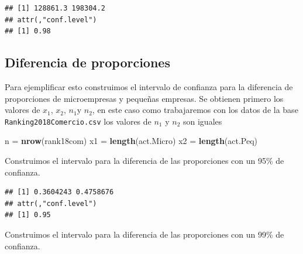 \documentclass[
]{krantz}
\makeatletter
\newenvironment{Shaded}{\begin{snugshade}}{\end{snugshade}}
\newcommand{\DataTypeTok}[1]{\textcolor[rgb]{0.27,0.27,0.27}{#1}}
\newcommand{\FloatTok}[1]{\textcolor[rgb]{0.06,0.06,0.06}{#1}}
\newcommand{\KeywordTok}[1]{\textcolor[rgb]{0.27,0.27,0.27}{\textbf{#1}}}
\newcommand{\NormalTok}[1]{#1}
\newcommand{\OperatorTok}[1]{\textcolor[rgb]{0.43,0.43,0.43}{\textbf{#1}}}
\newcommand{\StringTok}[1]{\textcolor[rgb]{0.5,0.5,0.5}{#1}}
\newenvironment{kframe}{%
\medskip{}
\setlength{\fboxsep}{.8em}
 \def\at@end@of@kframe{}%
 \ifinner\ifhmode%
  \def\at@end@of@kframe{\end{minipage}}%
  \begin{minipage}{\columnwidth}%
 \fi\fi%
 \def\FrameCommand##1{\hskip\@totalleftmargin \hskip-\fboxsep
 \colorbox{shadecolor}{##1}\hskip-\fboxsep
     \hskip-\linewidth \hskip-\@totalleftmargin \hskip\columnwidth}%
 \MakeFramed {\advance\hsize-\width
   \@totalleftmargin\z@ \linewidth\hsize
   \@setminipage}}%
 {\par\unskip\endMakeFramed%
 \at@end@of@kframe}
\renewenvironment{Shaded}{\begin{kframe}}{\end{kframe}}
\makeatother
\begin{document}
\begin{verbatim}
## [1] 128861.3 198304.2
## attr(,"conf.level")
## [1] 0.98
\end{verbatim}

\hypertarget{diferencia-de-proporciones}{%
\subsection{Diferencia de proporciones}\label{diferencia-de-proporciones}}

Para ejemplificar esto construimos el intervalo de confianza para la diferencia de proporciones de microempresas y pequeñas empresas. Se obtienen primero los valores de \(x_1\), \(x_2\), \(n_1\)y \(n_2\), en este caso como trabajaremos con los datos de la base \texttt{Ranking2018Comercio.csv} los valores de \(n_1\) y \(n_2\) son iguales

\begin{Shaded}
\begin{Highlighting}[]
\NormalTok{n =}\StringTok{ }\KeywordTok{nrow}\NormalTok{(rank18com)}
\NormalTok{x1 =}\StringTok{ }\KeywordTok{length}\NormalTok{(act.Micro)}
\NormalTok{x2 =}\StringTok{ }\KeywordTok{length}\NormalTok{(act.Peq)}
\end{Highlighting}
\end{Shaded}

Construimos el intervalo para la diferencia de las proporciones con un 95\% de confianza.

\begin{Shaded}
\end{Shaded}

\begin{verbatim}
## [1] 0.3604243 0.4758676
## attr(,"conf.level")
## [1] 0.95
\end{verbatim}

Construimos el intervalo para la diferencia de las proporciones con un 99\% de confianza.

\begin{Shaded}
\end{Shaded}
\end{document}
